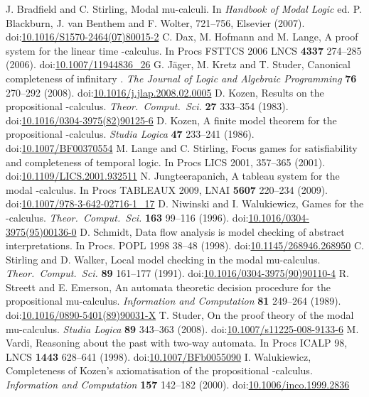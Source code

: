 \documentclass[copyright,creativecommons]{eptcs}
\begin{document}
\begin{thebibliography}{99}
\providecommand{\urlalt}[2]{\href{#1}{#2}} 
\providecommand{\doi}[1]{doi:\urlalt{http://dx.doi.org/#1}{#1}}

 J. Bradfield and C. Stirling, Modal mu-calculi. In
\emph{Handbook of Modal Logic} ed. P. Blackburn, J. van Benthem and
F. Wolter, 721--756, Elsevier (2007). 
\doi{10.1016/S1570-2464(07)80015-2}
 C. Dax, M. Hofmann and M. Lange, A proof system for
the linear time -calculus. In Procs FSTTCS 2006 LNCS {\bf 4337}
274--285 (2006). 
\doi{10.1007/11944836\_26}
 G. J\"{a}ger, M. Kretz and T. Studer,
Canonical completeness of infinitary . \emph{The Journal of
Logic and Algebraic Programming} {\bf 76} 270--292 (2008).
\doi{10.1016/j.jlap.2008.02.0005}
 D. Kozen, Results on the propositional -calculus.
 \emph{Theor.~Comput.~Sci.} {\bf 27} 333--354 (1983). 
\doi{10.1016/0304-3975(82)90125-6}
 D. Kozen, A finite model theorem for the propositional
-calculus. \emph{Studia Logica} {\bf 47} 233--241 (1986).
\doi{10.1007/BF00370554}
 M. Lange and C. Stirling, Focus games for satisfiability
and completeness of temporal logic. In Procs LICS 2001, 357--365 (2001).
\doi{10.1109/LICS.2001.932511}
 N. Jungteerapanich, A tableau system for the modal 
-calculus. In Procs TABLEAUX 2009, LNAI {\bf 5607} 220--234 (2009).
\doi{10.1007/978-3-642-02716-1\_17}
 D. Niwinski and I. Walukiewicz, Games for the -calculus.
 \emph{Theor.~Comput.~Sci.} {\bf 163} 99--116 (1996).
\doi{10.1016/0304-3975(95)00136-0}
 D. Schmidt, Data flow analysis is model checking of abstract 
interpretations. In Procs. POPL 1998 38--48 (1998). 
\doi{10.1145/268946.268950}
 C. Stirling and D. Walker, Local model checking in the modal
mu-calculus. \emph{Theor.~Comput.~Sci.} {\bf 89} 161--177 (1991).
\doi{10.1016/0304-3975(90)90110-4}
 R. Streett and E. Emerson, An automata theoretic 
decision procedure for the propositional mu-calculus. \emph{Information
 and Computation}
{\bf 81} 249--264 (1989).  
\doi{10.1016/0890-5401(89)90031-X}
 T. Studer, On the proof theory of the modal mu-calculus.
\emph{Studia Logica} {\bf 89} 343--363 (2008). 
\doi{10.1007/s11225-008-9133-6}
 M. Vardi, Reasoning about the past with two-way automata.
 In Procs ICALP 98, LNCS {\bf 1443} 628--641 (1998).
\doi{10.1007/BFb0055090}
 I. Walukiewicz, Completeness of Kozen's axiomatisation of 
the propositional -calculus. \emph{Information and Computation} 
{\bf 157} 142--182 (2000).
\doi{10.1006/inco.1999.2836}
\end{thebibliography}
\end{document}

